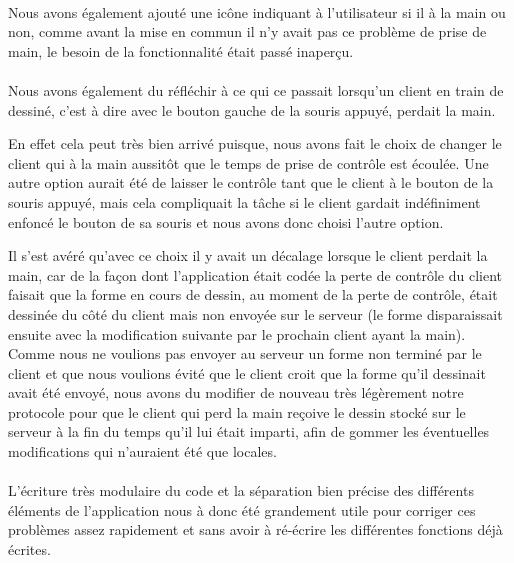 \documentclass[a4paper,11pt]{article}
\begin{document}
\paragraph{} Nous avons également ajouté une icône indiquant à l'utilisateur si il à la main ou non, comme avant la mise en commun il n'y avait pas ce problème de prise de main, le besoin de la fonctionnalité était passé inaperçu.

\paragraph{} Nous avons également du réfléchir à ce qui ce passait lorsqu'un client en train de dessiné, c'est à dire avec le bouton gauche de la souris appuyé, perdait la main.

En effet cela peut très bien arrivé puisque, nous avons fait le choix de changer le client qui à la main aussitôt que le temps de prise de contrôle est écoulée. Une autre option aurait été de laisser le contrôle tant que le client à le bouton de la souris appuyé, mais cela compliquait la tâche si le client gardait indéfiniment enfoncé le bouton de sa souris et nous avons donc choisi l'autre option.

Il s'est avéré qu'avec ce choix il y avait un décalage lorsque le client perdait la main, car de la façon dont l'application était codée la perte de contrôle du client faisait que la forme en cours de dessin, au moment de la perte de contrôle, était dessinée du côté du client mais non envoyée sur le serveur (le forme disparaissait ensuite avec la modification suivante par le prochain client ayant la main). Comme nous ne voulions pas envoyer au serveur un forme non terminé par le client et que nous voulions évité que le client croit que la forme qu'il dessinait avait été envoyé, nous avons du modifier de nouveau très légèrement notre protocole pour que le client qui perd la main reçoive le dessin stocké sur le serveur à la fin du temps qu'il lui était imparti, afin de gommer les éventuelles modifications qui n'auraient été que locales.

\paragraph{} L'écriture très modulaire du code et la séparation bien précise des différents éléments de l'application nous à donc été grandement utile pour corriger ces problèmes assez rapidement et sans avoir à ré-écrire les différentes fonctions déjà écrites.
\end{document}
